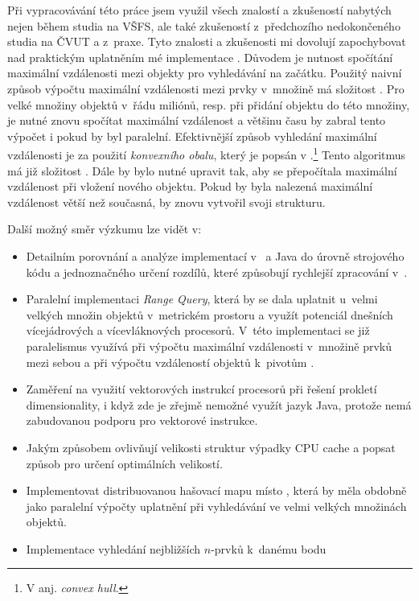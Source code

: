 Při vypracovávání této práce jsem využil všech znalostí a zkušeností nabytých nejen během studia na VŠFS, ale také zkušeností z~předchozího nedokončeného studia na ČVUT a z~praxe.
Tyto znalosti a zkušenosti mi dovolují zapochybovat nad praktickým uplatněním mé implementace .
Důvodem je nutnost spočítání maximální vzdálenosti mezi objekty pro vyhledávání na začátku.
Použitý naivní způsob výpočtu maximální vzdálenosti mezi prvky v~množině má složitost .
Pro velké množiny objektů v~řádu miliónů, resp. při přidání objektu do této množiny, je nutné znovu spočítat maximální vzdálenost a většinu času by zabral tento výpočet i pokud by byl paralelní.
Efektivnější způsob vyhledání maximální vzdálenosti je za použití \emph{konvexního obalu}, který je popsán v \cite{Cormen:2001:IA:580470}.\footnote{V anj. \emph{convex hull}.}
Tento algoritmus má již složitost .
Dále by bylo nutné upravit \MIndex{} tak, aby se přepočítala maximální vzdálenost při vložení nového objektu.
Pokud by byla nalezená maximální vzdálenost větší než současná, \MIndex{} by znovu vytvořil svoji strukturu.

Další možný směr výzkumu  lze vidět v:
\begin{itemize}
\item Detailním porovnání a analýze implementací v~\CC{} a Java do úrovně strojového kódu a jednoznačného určení rozdílů, které způsobují rychlejší zpracování v~\CC{}.
\item Paralelní implementaci \emph{Range Query}, která by se dala uplatnit u~velmi velkých množin objektů v~metrickém prostoru a využít potenciál dnešních vícejádrových a vícevláknových procesorů. V~této implementaci se již paralelismus využívá při výpočtu maximální vzdálenosti v~množině prvků mezi sebou a při výpočtu vzdáleností objektů k~pivotům .
\item Zaměření na využití vektorových instrukcí procesorů při řešení prokletí dimensionality, i když zde je zřejmě nemožné využít jazyk Java, protože nemá zabudovanou podporu pro vektorové instrukce.
\item Jakým způsobem ovlivňují velikosti struktur výpadky CPU cache a popsat způsob pro určení optimálních velikostí.
\item Implementovat distribuovanou hašovací mapu místo \BPTree{}, která by měla obdobně jako paralelní výpočty uplatnění při vyhledávání ve velmi velkých množinách objektů.
\item Implementace vyhledání nejbližších $n$-prvků k~danému bodu
 \end{itemize}
